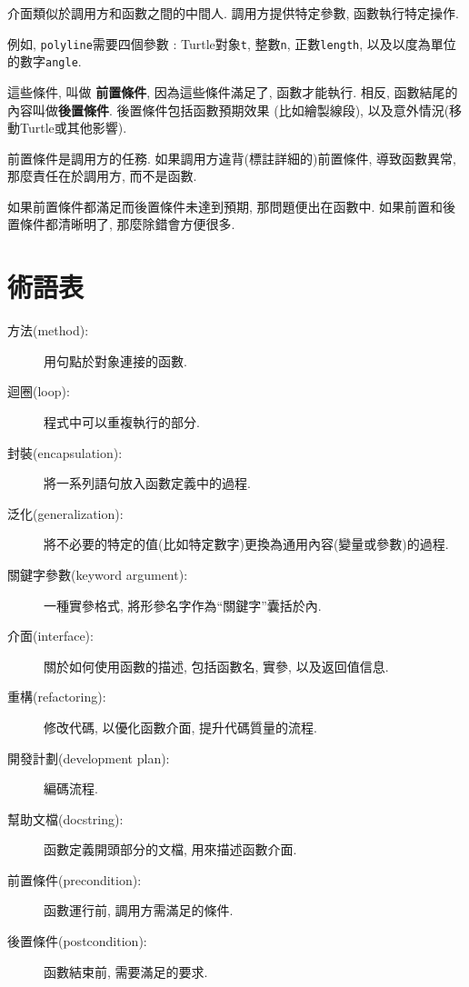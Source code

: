 \documentclass[10pt]{book}
\begin{document}
介面類似於調用方和函數之間的中間人. 
調用方提供特定參數, 函數執行特定操作. 

例如,  {\tt polyline}需要四個參數 : Turtle對象{\tt t},  整數{\tt n}, 
正數{\tt length},  以及以度為單位的數字{\tt angle}.

這些條件, 叫做 {\bf 前置條件},  因為這些條件滿足了, 函數才能執行. 
相反, 函數結尾的內容叫做{\bf 後置條件}. 後置條件包括函數預期效果
(比如繪製線段),  以及意外情況(移動Turtle或其他影響).

前置條件是調用方的任務. 如果調用方違背(標註詳細的)前置條件, 導致函數異常, 
那麼責任在於調用方, 而不是函數. 

如果前置條件都滿足而後置條件未達到預期, 那問題便出在函數中. 
如果前置和後置條件都清晰明了, 那麼除錯會方便很多. 

\section{術語表}

\begin{description}

\item[方法(method):] 用句點於對象連接的函數. 

\item[迴圈(loop):] 程式中可以重複執行的部分. 

\item[封裝(encapsulation):] 將一系列語句放入函數定義中的過程. 

\item[泛化(generalization):] 將不必要的特定的值(比如特定數字)更換為通用內容(變量或參數)的過程. 

\item[關鍵字參數(keyword argument):] 一種實參格式, 將形參名字作為``關鍵字''囊括於內. 

\item[介面(interface):] 關於如何使用函數的描述, 包括函數名, 實參, 以及返回值信息. 

\item[重構(refactoring):] 修改代碼, 以優化函數介面, 提升代碼質量的流程.

\item[開發計劃(development plan):] 編碼流程.

\item[幫助文檔(docstring):] 函數定義開頭部分的文檔, 用來描述函數介面. 

\item[前置條件(precondition):] 函數運行前, 調用方需滿足的條件. 

\item[後置條件(postcondition):] 函數結束前, 需要滿足的要求.

\end{description}
\end{document}
